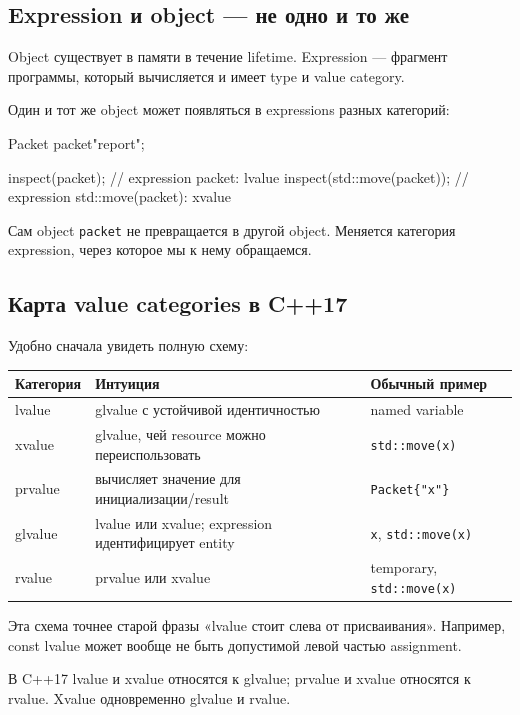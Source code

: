 \subsection{Expression и object --- не одно и то же}

Object существует в памяти в течение lifetime. Expression --- фрагмент
программы, который вычисляется и имеет type и value category.

Один и тот же object может появляться в expressions разных категорий:

\begin{cppcode}
Packet packet{"report"};

inspect(packet);            // expression packet: lvalue
inspect(std::move(packet)); // expression std::move(packet): xvalue
\end{cppcode}

Сам object \texttt{packet} не превращается в другой object. Меняется категория
expression, через которое мы к нему обращаемся.

\subsection{Карта value categories в C++17}

Удобно сначала увидеть полную схему:

\begin{center}
\begin{tabularx}{\textwidth}{L{0.22\textwidth}YY}
\toprule
Категория & Интуиция & Обычный пример \\
\midrule
lvalue & glvalue с устойчивой идентичностью & named variable \\
xvalue & glvalue, чей resource можно переиспользовать & \texttt{std::move(x)} \\
prvalue & вычисляет значение для инициализации/result & \texttt{Packet\{"x"\}} \\
glvalue & lvalue или xvalue; expression идентифицирует entity & \texttt{x}, \texttt{std::move(x)} \\
rvalue & prvalue или xvalue & temporary, \texttt{std::move(x)} \\
\bottomrule
\end{tabularx}
\end{center}

Эта схема точнее старой фразы «lvalue стоит слева от присваивания».
Например, const lvalue может вообще не быть допустимой левой частью assignment.

\begin{standardbox}
В C++17 lvalue и xvalue относятся к glvalue; prvalue и xvalue относятся к
rvalue. Xvalue одновременно glvalue и rvalue.
\end{standardbox}


